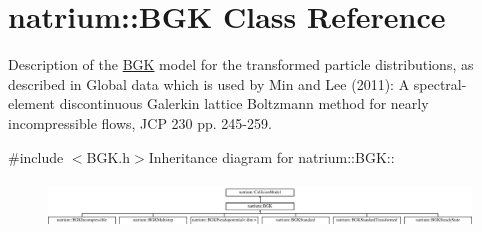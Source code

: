 \hypertarget{classnatrium_1_1BGK}{
\section{natrium::BGK Class Reference}
\label{classnatrium_1_1BGK}
}


Description of the \hyperlink{classnatrium_1_1BGK}{BGK} model for the transformed particle distributions, as described in Global data which is used by Min and Lee (2011): A spectral-\/element discontinuous Galerkin lattice Boltzmann method for nearly incompressible flows, JCP 230 pp. 245-\/259.  


{\ttfamily \#include $<$BGK.h$>$}Inheritance diagram for natrium::BGK::\begin{figure}[H]
\begin{center}
\leavevmode
\includegraphics[height=1.25cm]{classnatrium_1_1BGK}
\end{center}
\end{figure}

